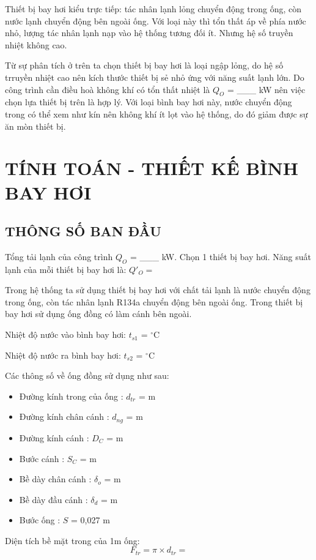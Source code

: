 Thiết bị bay hơi kiểu trực tiếp: tác nhân lạnh lỏng chuyển động trong ống, còn nước lạnh chuyển động bên ngoài ống. Với loại này thì tổn thất áp về phía nước nhỏ, lượng tác nhân lạnh nạp vào hệ thống tương đối ít. Nhưng hệ số truyền nhiệt không cao.

Từ sự phân tích ở trên ta chọn thiết bị bay hơi là loại ngập lỏng, do hệ số trruyền nhiệt cao nên kích thước thiết bị sẻ nhỏ ứng với năng suất lạnh lớn. Do công trình cần điều hoà không khí có tổn thất nhiệt là $Q_{O}$ = \_\_\_ kW nên việc chọn lựa thiết bị trên là hợp lý. Với loại bình bay hơi này, nước chuyển động trong có thể xem như kín nên không khí ít lọt vào hệ thống, do đó giảm được sự ăn mòn thiết bị.

\section{TÍNH TOÁN - THIẾT KẾ BÌNH BAY HƠI}
\subsection{THÔNG SỐ BAN ĐẦU}
Tổng tải lạnh của công trình $Q_{O}$ = \_\_\_ kW. Chọn 1 thiết bị bay hơi. Năng suất lạnh của mỗi thiết bị bay hơi là: $Q'_{O} = $

Trong hệ thống ta sử dụng thiết bị bay hơi với chất tải lạnh là nước chuyển động trong ống, còn tác nhân lạnh R134a chuyển động bên ngoài ống. Trong thiết bị bay hơi sử dụng ống đồng có làm cánh bên ngoài.

Nhiệt độ nước vào bình bay hơi: $t_{s1}$ = $^{\circ}$C

Nhiệt độ nước ra bình bay hơi: $t_{s2}$ = $^{\circ}$C

Các thông số về ống đồng sử dụng như sau:
\begin{itemize}
	\item Đường kính trong của ống : $ d_{tr} $ =  m
	\item Đường kính chân cánh : $ d_{ng} $ =  m
	\item Đường kính cánh : $D_{C}$ =  m
	\item Bước cánh : $ S_{C} $ =  m
	\item Bề dày chân cánh : $ \delta_{o} $ =  m
	\item Bề dày đầu cánh : $ \delta_{d} $ = m
	\item Bước ống : $S$ = 0,027 m
\end{itemize}

Diện tích bề mặt trong của 1m ống:
\begin{equation*}
	F_{tr} = \pi\times d_{tr} = 
\end{equation*}

